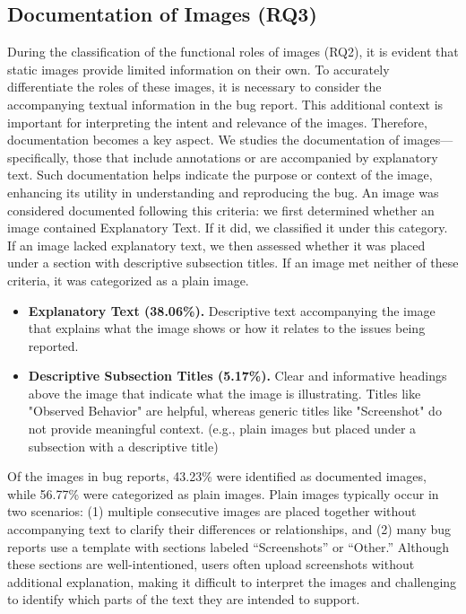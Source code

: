 

\subsection{Documentation of Images (RQ3)}
%
During the classification of the functional roles of images (RQ2), it is evident that static images provide limited information on their own. To accurately differentiate the roles of these images, it is necessary to consider the accompanying textual information in the bug report. This additional context is important for interpreting the intent and relevance of the images. Therefore, documentation becomes a key aspect. We studies the documentation of images—specifically, those that include annotations or are accompanied by explanatory text. Such documentation helps indicate the purpose or context of the image, enhancing its utility in understanding and reproducing the bug.
An image was considered documented following this criteria: we first determined whether an image contained Explanatory Text. If it did, we classified it under this category. If an image lacked explanatory text, we then assessed whether it was placed under a section with descriptive subsection titles. If an image met neither of these criteria, it was categorized as a plain image.
\begin{itemize}[left=0.1cm]
    \item \textbf{Explanatory Text (38.06\%).} Descriptive text accompanying the image that explains what the image shows or how it relates to the issues being reported.

    \item \textbf{Descriptive Subsection Titles (5.17\%).} Clear and informative headings above the image that indicate what the image is illustrating. Titles like "Observed Behavior" are helpful, whereas generic titles like "Screenshot" do not provide meaningful context. (e.g., plain images but placed under a subsection with a descriptive title)

\end{itemize}

\noindent
Of the images in bug reports, 43.23\% were identified as documented images, while 56.77\% were categorized as plain images. Plain images typically occur in two scenarios: (1) multiple consecutive images are placed together without accompanying text to clarify their differences or relationships, and (2) many bug reports use a template with sections labeled “Screenshots” or “Other.” Although these sections are well-intentioned, users often upload screenshots without additional explanation, making it difficult to interpret the images and challenging to identify which parts of the text they are intended to support. 





